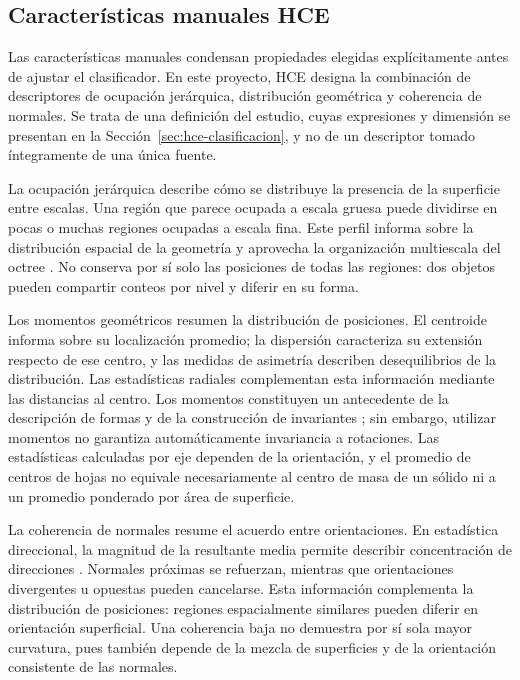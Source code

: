 \subsection{Características manuales HCE}
Las características manuales condensan propiedades elegidas explícitamente antes de ajustar el clasificador. En este proyecto, HCE designa la combinación de descriptores de ocupación jerárquica, distribución geométrica y coherencia de normales. Se trata de una definición del estudio, cuyas expresiones y dimensión se presentan en la Sección~\ref{sec:hce-clasificacion}, y no de un descriptor tomado íntegramente de una única fuente.

La ocupación jerárquica describe cómo se distribuye la presencia de la superficie entre escalas. Una región que parece ocupada a escala gruesa puede dividirse en pocas o muchas regiones ocupadas a escala fina. Este perfil informa sobre la distribución espacial de la geometría y aprovecha la organización multiescala del octree \parencite{samet}. No conserva por sí solo las posiciones de todas las regiones: dos objetos pueden compartir conteos por nivel y diferir en su forma.

Los momentos geométricos resumen la distribución de posiciones. El centroide informa sobre su localización promedio; la dispersión caracteriza su extensión respecto de ese centro, y las medidas de asimetría describen desequilibrios de la distribución. Las estadísticas radiales complementan esta información mediante las distancias al centro. Los momentos constituyen un antecedente de la descripción de formas y de la construcción de invariantes \parencite{sadjadi1980}; sin embargo, utilizar momentos no garantiza automáticamente invariancia a rotaciones. Las estadísticas calculadas por eje dependen de la orientación, y el promedio de centros de hojas no equivale necesariamente al centro de masa de un sólido ni a un promedio ponderado por área de superficie.

La coherencia de normales resume el acuerdo entre orientaciones. En estadística direccional, la magnitud de la resultante media permite describir concentración de direcciones \parencite{mardia1999}. Normales próximas se refuerzan, mientras que orientaciones divergentes u opuestas pueden cancelarse. Esta información complementa la distribución de posiciones: regiones espacialmente similares pueden diferir en orientación superficial. Una coherencia baja no demuestra por sí sola mayor curvatura, pues también depende de la mezcla de superficies y de la orientación consistente de las normales.

